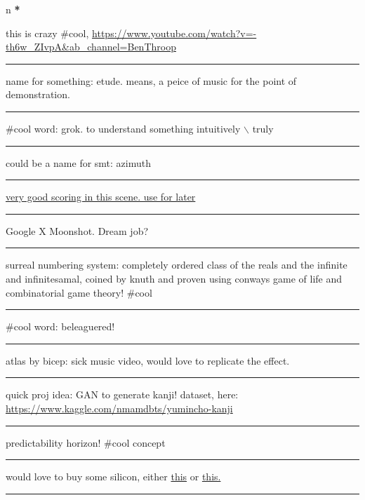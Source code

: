 \documentclass[letterpaper]{article}
\date{\today}
\title{}
\renewcommand{\tableofcontents}{}
\begin{document}
\tableofcontents

n \textbf{*}

this is crazy \#cool,
\url{https://www.youtube.com/watch?v=-th6w\_ZIvpA\&ab\_channel=BenThroop}

\noindent\rule{\textwidth}{0.5pt}

name for something: etude. means, a peice of music for the point of
demonstration.

\noindent\rule{\textwidth}{0.5pt}

\#cool word: grok. to understand something intuitively $\backslash$ truly

\noindent\rule{\textwidth}{0.5pt}

could be a name for smt: azimuth

\noindent\rule{\textwidth}{0.5pt}

\href{https://www.youtube.com/watch?v=uvap4gEOC5I\&ab\_channel=SonyPicturesHomeEntertainment}{very
good scoring in this scene. use for later}

\noindent\rule{\textwidth}{0.5pt}

Google X Moonshot. Dream job?

\noindent\rule{\textwidth}{0.5pt}

surreal numbering system: completely ordered class of the reals and the
infinite and infinitesamal, coined by knuth and proven using conways
game of life and combinatorial game theory! \#cool

\noindent\rule{\textwidth}{0.5pt}

\#cool word: beleaguered!

\noindent\rule{\textwidth}{0.5pt}

atlas by bicep: sick music video, would love to replicate the effect.

\noindent\rule{\textwidth}{0.5pt}

quick proj idea: GAN to generate kanji! dataset, here:
\url{https://www.kaggle.com/nmamdbts/yumincho-kanji}

\noindent\rule{\textwidth}{0.5pt}

predictability horizon! \#cool concept

\noindent\rule{\textwidth}{0.5pt}

would love to buy some silicon, either
\href{https://www.amazon.com/Silicon-Metal-99-999-Pure/dp/B08FVLJM8L}{this}
or
\href{https://www.amazon.com/Silicon-Wafer-Single-Sided-Polish/dp/B08RZ5ZYNF/}{this.}

\noindent\rule{\textwidth}{0.5pt}
\end{document}

